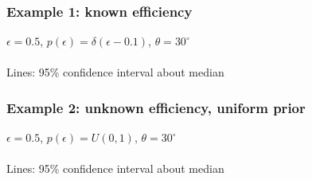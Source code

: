 \documentclass{beamer}
\begin{document}
\begin{frame}
\frametitle{Example 1: known efficiency}
$\epsilon=0.5$, $p(\epsilon)=\delta(\epsilon-0.1)$, $\theta=30^{\circ}$\\~\\
Lines: 95\% confidence interval about median
\begin{figure}
    \centering
\end{figure}
\end{frame}

\begin{frame}
\frametitle{Example 2: unknown efficiency, uniform prior}
$\epsilon=0.5$, $p(\epsilon)=U(0,1)$, $\theta=30^{\circ}$\\~\\
Lines: 95\% confidence interval about median
\begin{figure}
    \centering
\end{figure}
\end{frame}
\end{document}
